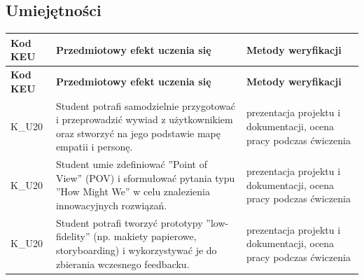 \documentclass[12pt, a4paper]{article}
\newcommand{\thdrule}{\noalign{\global\setlength{\extrarowheight}{0pt}}}
\newcommand{\thdend}{\noalign{\global\setlength{\extrarowheight}{3pt}}}
\begin{document}
\subsection*{Umiejętności}
{\scriptsize
\begin{longtable}{m{1.6cm}m{9.0cm}m{4.2cm}}
\thdrule\toprule
\rowcolor{pjatkRed} {\color{white}\footnotesize\textbf{\vphantom{Ag}Kod KEU}} & {\color{white}\footnotesize\textbf{\vphantom{Ag}Przedmiotowy efekt uczenia się}} & {\color{white}\footnotesize\textbf{\vphantom{Ag}Metody weryfikacji}} \\
\midrule\thdend
\endfirsthead
\thdrule\toprule
\rowcolor{pjatkRed} {\color{white}\footnotesize\textbf{\vphantom{Ag}Kod KEU}} & {\color{white}\footnotesize\textbf{\vphantom{Ag}Przedmiotowy efekt uczenia się}} & {\color{white}\footnotesize\textbf{\vphantom{Ag}Metody weryfikacji}} \\
\midrule\thdend
\endhead
  \rowcolor{tableRowLight} K\_U20 & Student potrafi samodzielnie przygotować i przeprowadzić wywiad z użytkownikiem oraz stworzyć na jego podstawie mapę empatii i personę. & prezentacja projektu i dokumentacji, ocena pracy podczas ćwiczenia \\
  \rowcolor{tableRowAlt} K\_U20 & Student umie zdefiniować ''Point of View'' (POV) i sformułować pytania typu ''How Might We'' w celu znalezienia innowacyjnych rozwiązań. & prezentacja projektu i dokumentacji, ocena pracy podczas ćwiczenia \\
  \rowcolor{tableRowLight} K\_U20 & Student potrafi tworzyć prototypy ''low-fidelity'' (np. makiety papierowe, storyboarding) i wykorzystywać je do zbierania wczesnego feedbacku. & prezentacja projektu i dokumentacji, ocena pracy podczas ćwiczenia \\
\bottomrule
\end{longtable}}
\end{document}
